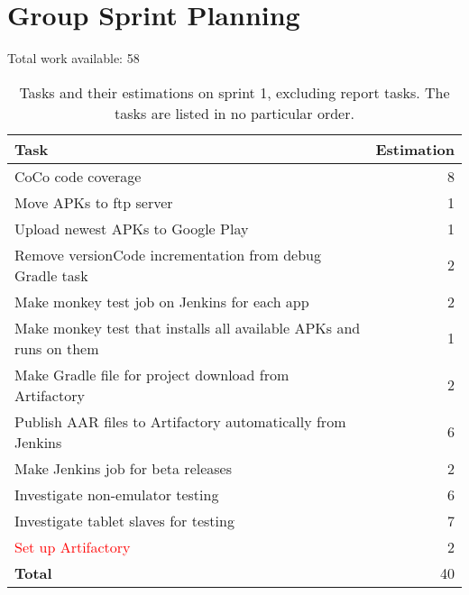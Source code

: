 \section{Group Sprint Planning}
Total work available: 58

\begin{table}[htp]%
  \centering
  \begin{tabular}{lr}
    \toprule
    \textbf{Task} & \textbf{Estimation} \\
    \midrule
    CoCo code coverage & 8 \\
    Move APKs to ftp server & 1 \\
    Upload newest APKs to Google Play & 1 \\
    Remove versionCode incrementation from debug Gradle task & 2 \\
    Make monkey test job on Jenkins for each app & 2 \\
    Make monkey test that installs all available APKs and runs on them & 1 \\
    Make Gradle file for project download from Artifactory & 2 \\
    Publish AAR files to Artifactory automatically from Jenkins & 6 \\
    Make Jenkins job for beta releases & 2 \\
    Investigate non-emulator testing & 6 \\
    Investigate tablet slaves for testing & 7 \\
    \textcolor{red}{Set up Artifactory} & 2 \\
    \midrule
    \textbf{Total} & 40 \\
    \bottomrule
  \end{tabular}
\caption{Tasks and their estimations on sprint 1, excluding report tasks. The tasks are listed in no particular order.}
\label{tab:sprint1_tasks}
\end{table}

